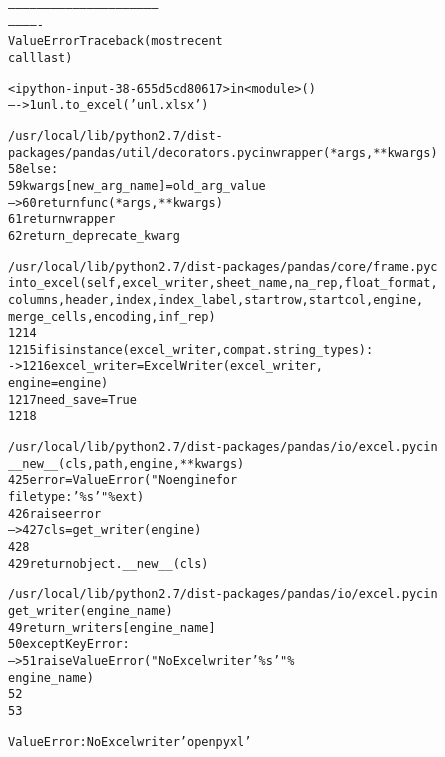 \documentclass[letterpaper,10pt,english]{/usr/local/lib/python2.7/dist-packages/sphinx/texinputs/sphinxhowto}
\begin{document}
                
            \begin{alltt}

        --------------------------------------------------------------
-------------
    ValueError                                Traceback (most recent
call last)



        <ipython-input-38-655d5cd80617> in <module>()
    ----> 1 unl.to\_excel('unl.xlsx')




        /usr/local/lib/python2.7/dist-
packages/pandas/util/decorators.pyc in wrapper(*args, **kwargs)
         58                 else:
         59                     kwargs[new\_arg\_name] = old\_arg\_value
    ---> 60             return func(*args, **kwargs)
         61         return wrapper
         62     return \_deprecate\_kwarg




        /usr/local/lib/python2.7/dist-packages/pandas/core/frame.pyc
in to\_excel(self, excel\_writer, sheet\_name, na\_rep, float\_format,
columns, header, index, index\_label, startrow, startcol, engine,
merge\_cells, encoding, inf\_rep)
       1214
       1215         if isinstance(excel\_writer, compat.string\_types):
    -> 1216             excel\_writer = ExcelWriter(excel\_writer,
engine=engine)
       1217             need\_save = True
       1218




        /usr/local/lib/python2.7/dist-packages/pandas/io/excel.pyc in
\_\_new\_\_(cls, path, engine, **kwargs)
        425                     error = ValueError("No engine for
filetype: '\%s'" \% ext)
        426                     raise error
    --> 427             cls = get\_writer(engine)
        428
        429         return object.\_\_new\_\_(cls)




        /usr/local/lib/python2.7/dist-packages/pandas/io/excel.pyc in
get\_writer(engine\_name)
         49         return \_writers[engine\_name]
         50     except KeyError:
    ---> 51         raise ValueError("No Excel writer '\%s'" \%
engine\_name)
         52
         53




        ValueError: No Excel writer 'openpyxl'

\end{alltt}
        
            
        
    
\end{document}
